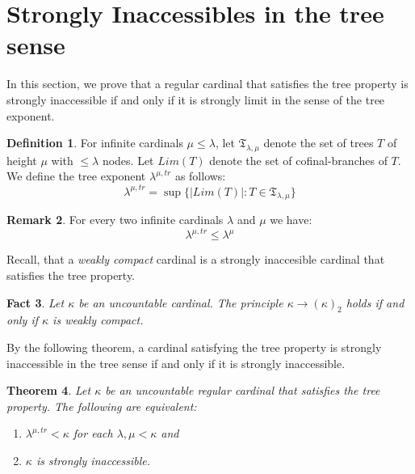 \documentclass[11pt]{amsart}
\theoremstyle{plain}
\newtheorem{theorem}{Theorem}[section]
\newtheorem{fact}[theorem]{Fact}
\theoremstyle{definition} %
\newtheorem{definition}[theorem]{Definition}
\newtheorem{remark}[theorem]{Remark}
\theoremstyle{remark}
\begin{document}
\section{Strongly Inaccessibles in the tree sense}\label{section strongly inaccessibles}
In this section, we prove that a regular cardinal that satisfies the tree property is strongly inaccessible if and only if it is strongly limit in the sense of the tree exponent.

\begin{definition}\cite{sh589}
For infinite cardinals $\mu \leq \lambda$, let $\mathfrak{T}_{\lambda,\mu}$ denote the set of trees $T$ of height $\mu$ with $\leq \lambda$ nodes. Let $Lim(T)$ denote the set of cofinal-branches of $T$. We define the tree exponent $\lambda^{\mu,tr}$ as follows:
\[
\lambda^{\mu,tr}=\sup\{|Lim(T)|:T \in \mathfrak{T}_{\lambda,\mu}\}
\]
\end{definition}

\begin{remark}\label{remark tree exponent leq exponent}
For every two infinite cardinals $\lambda$ and $\mu$ we have:
\[
\lambda^{\mu,tr} \leq \lambda^\mu
\]
\end{remark}

Recall, that a \emph{weakly compact} cardinal is a strongly inaccesible cardinal that satisfies the tree property.

\begin{fact}\label{fact 6.3}
Let $\kappa$ be an uncountable cardinal. The principle $\kappa \to (\kappa)_2$ holds if and only if $\kappa$ is weakly compact.
\end{fact}



By the following theorem, a cardinal satisfying the tree property is strongly inaccessible in the tree sense if and only if it is strongly inaccessible.
\begin{theorem}\label{theorem 5.4}
Let $\kappa$ be an uncountable regular cardinal that satisfies the tree property. The following are equivalent:
\begin{enumerate}
\item $\lambda^{\mu,tr}<\kappa$ for each $\lambda,\mu<\kappa$ and \item  $\kappa$ is strongly inaccessible.
\end{enumerate}
\end{theorem}
\end{document}
